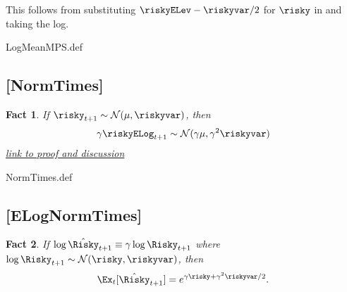\message{ !name(MathFactsList.tex)}\documentclass{handout}
\newtheorem{Fact}{Fact}
\begin{document}
This follows from substituting $\riskyELev - \riskyvar/2$ for $\risky$ in {\ELogNorm} and taking the log.

\begin{verbatimwrite}{LogMeanMPS.def}
\providecommand{\LogMeanMPS}{\href{https://www.econ2.jhu.edu/people/ccarroll/public/LectureNotes/MathFacts/MathFactsList\#LogMeanMPS}{\ensuremath{\mathtt{[LogMeanMPS]}}}}
\end{verbatimwrite}


\hypertarget{NormTimes}{}
\subsection{[NormTimes]}\label{NormTimes}

\begin{Fact} If $\risky_{t+1} \sim \mathcal{N}(\mu,\riskyvar)$, then
\begin{equation}
        \gamma \riskyELog_{t+1} \sim \mathcal{N}(\gamma \mu,\gamma^{2} \riskyvar)
      \end{equation}
\indent      \href{https://math.stackexchange.com/questions/1543687}{link to proof and discussion}
\end{Fact}

\begin{verbatimwrite}{NormTimes.def}
\providecommand{\NormTimes}{\href{https://www.econ2.jhu.edu/people/ccarroll/public/LectureNotes/MathFacts/MathFactsList\#NormTimes}{\ensuremath{\mathtt{[NormTimes]}}}}
\end{verbatimwrite}

\hypertarget{ELogNormTimes}{}
\subsection{[ELogNormTimes]}

\begin{Fact} If $\log \hat{\Risky}_{t+1} \equiv \gamma \log \Risky_{t+1}$ where $\log \Risky_{t+1} \sim \mathcal{N}(\risky,\riskyvar)$, then
\begin{equation}
        \Ex_{t}[\hat{\Risky}_{t+1}] = e^{\gamma \risky+\gamma^{2}\riskyvar/2} \label{eq:ELogNormTimes}.
      \end{equation}

      
    \end{Fact}
    
\end{document}
